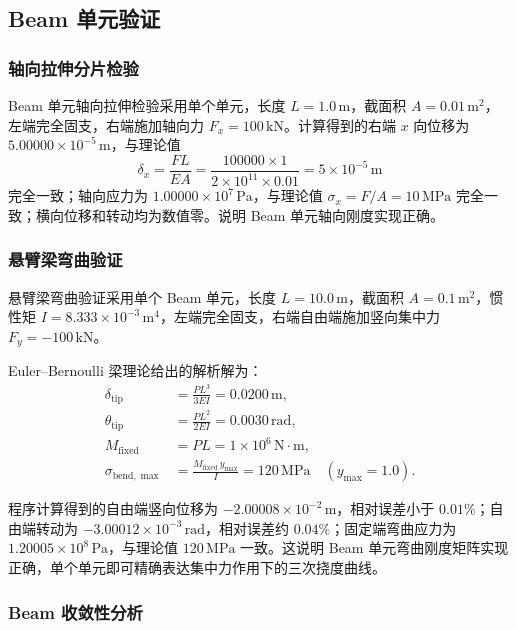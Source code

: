 \documentclass[UTF8,a4paper,zihao=-4]{ctexart}
\begin{document}
\subsection{Beam 单元验证}

\subsubsection{轴向拉伸分片检验}

Beam 单元轴向拉伸检验采用单个单元，长度 $L=1.0\,\mathrm{m}$，截面积 $A=0.01\,\mathrm{m^2}$，左端完全固支，右端施加轴向力 $F_x=100\,\mathrm{kN}$。计算得到的右端 $x$ 向位移为 $5.00000\times10^{-5}\,\mathrm{m}$，与理论值
\[
    \delta_x = \frac{FL}{EA} = \frac{100000\times1}{2\times10^{11}\times0.01} = 5\times10^{-5}\,\mathrm{m}
\]
完全一致；轴向应力为 $1.00000\times10^7\,\mathrm{Pa}$，与理论值 $\sigma_x=F/A=10\,\mathrm{MPa}$ 完全一致；横向位移和转动均为数值零。说明 Beam 单元轴向刚度实现正确。

\subsubsection{悬臂梁弯曲验证}

悬臂梁弯曲验证采用单个 Beam 单元，长度 $L=10.0\,\mathrm{m}$，截面积 $A=0.1\,\mathrm{m^2}$，惯性矩 $I=8.333\times10^{-3}\,\mathrm{m^4}$，左端完全固支，右端自由端施加竖向集中力 $F_y=-100\,\mathrm{kN}$。

Euler--Bernoulli 梁理论给出的解析解为：
\begin{align}
    \delta_{\mathrm{tip}} &= \frac{PL^3}{3EI} = 0.0200\,\mathrm{m},\\
    \theta_{\mathrm{tip}} &= \frac{PL^2}{2EI} = 0.0030\,\mathrm{rad},\\
    M_{\mathrm{fixed}} &= PL = 1\times10^6\,\mathrm{N\cdot m},\\
    \sigma_{\mathrm{bend},\max} &= \frac{M_{\mathrm{fixed}}\,y_{\max}}{I} = 120\,\mathrm{MPa}\quad (y_{\max}=1.0).
\end{align}

程序计算得到的自由端竖向位移为 $-2.00008\times10^{-2}\,\mathrm{m}$，相对误差小于 $0.01\%$；自由端转动为 $-3.00012\times10^{-3}\,\mathrm{rad}$，相对误差约 $0.04\%$；固定端弯曲应力为 $1.20005\times10^8\,\mathrm{Pa}$，与理论值 $120\,\mathrm{MPa}$ 一致。这说明 Beam 单元弯曲刚度矩阵实现正确，单个单元即可精确表达集中力作用下的三次挠度曲线。

\subsubsection{Beam 收敛性分析}
\end{document}
